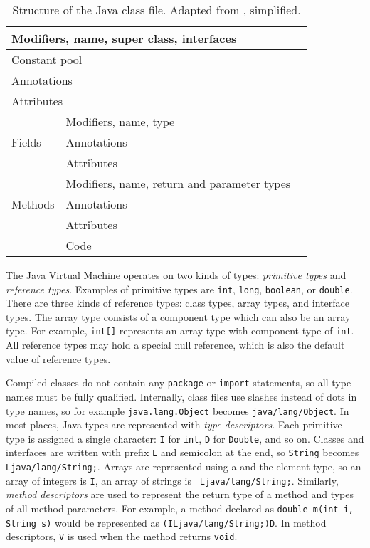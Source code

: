 \begin{table}
    \begin{center}
        \label{classfile}
        \begin{tabular}{|l|l|l|}
            \hline
            \multicolumn{2}{|l|}{Modifiers, name, super class, interfaces} \\
            \hline
            \multicolumn{2}{|l|}{Constant pool} \\
            \hline
            \multicolumn{2}{|l|}{Annotations} \\
            \hline
            \multicolumn{2}{|l|}{Attributes} \\
            \hline
            \multirow{3}{*}{Fields} & Modifiers, name, type \\
            & Annotations \\
            & Attributes \\
            \hline
            \multirow{3}{*}{Methods} & Modifiers, name, return and parameter types \\
            & Annotations \\
            & Attributes \\
            & Code \\
            \hline
        \end{tabular}
        \caption{Structure of the Java class file. Adapted from \cite{asmguide},
        simplified.}
    \end{center}
\end{table}

The Java Virtual Machine operates on two kinds of types: \emph{primitive types}
and \emph{reference types}. Examples of primitive types are \texttt{int},
\texttt{long}, \texttt{boolean}, or \texttt{double}. There are three kinds of
reference types: class types, array types, and interface types. The array type
consists of a component type which can also be an array type. For example,
\texttt{int[]} represents an array type with component type of \texttt{int}. All
reference types may hold a special null reference, which is also the default
value of reference types.

Compiled classes do not contain any \texttt{package} or \texttt{import}
statements, so all type names must be fully qualified. Internally, class files
use slashes instead of dots in type names, so for example
\texttt{java.lang.Object} becomes \texttt{java/lang/Object}. In most places,
Java types are represented with \emph{type descriptors}. Each primitive type is
assigned a single character: \texttt{I} for \texttt{int}, \texttt{D} for
\texttt{Double}, and so on. Classes and interfaces are written with prefix
\texttt{L} and semicolon at the end, so \texttt{String} becomes
\texttt{Ljava/lang/String;}. Arrays are represented using a
\texttt{\leftbracket} and the element type, so an array of integers is
\texttt{\leftbracket I}, an array of strings is \texttt{\leftbracket
Ljava/lang/String;}. Similarly, \emph{method descriptors} are used to represent
the return type of a method and types of all method parameters. For example, a
method declared as \texttt{double m(int i, String s)} would be represented as
\texttt{(ILjava/lang/String;)D}. In method descriptors, \texttt{V} is used when
the method returns \texttt{void}.

